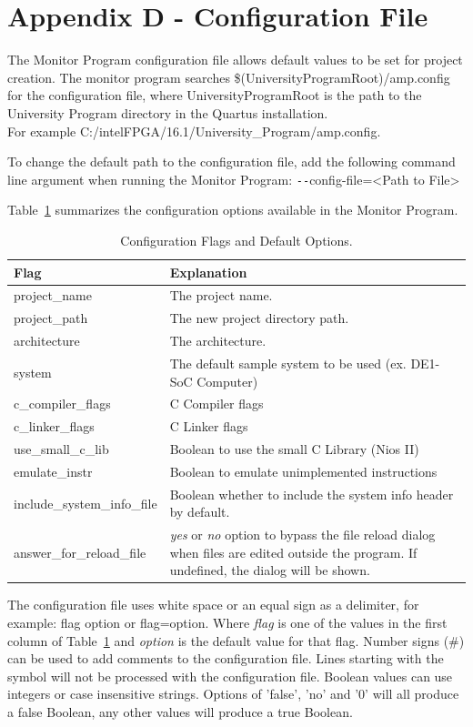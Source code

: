 \documentclass[11pt, twoside, pdftex]{article}
\newcommand{\commonPath}{../../Common}
\begin{document}
\section{Appendix D - Configuration File}
The Monitor Program configuration file allows default values to be set for project creation. The monitor program searches 
{\sf \$(UniversityProgramRoot)/amp.config} for the configuration file, where {\sf UniversityProgramRoot} is the path to the 
University Program directory in the Quartus installation.\\
For example {\sf C:/intelFPGA/16.1/University\_Program/amp.config}.

To change the default path to the configuration file, add the following command line argument 
when running the Monitor Program: {\sf \texttt{-}\texttt{-}config-file=<Path to File>}

Table~\ref{tbl:2} summarizes the configuration options available in the Monitor Program.

\begin{table}[h]
    \centering
    \begin{tabular}{|l|p{5in}|}
        \hline
        Flag & Explanation\\
        \hline\hline
				\hline
				project\_name				& The project name.\\
				project\_path				& The new project directory path.\\
				architecture				& The architecture.\\
				system							& The default sample system to be used (ex. DE1-SoC Computer)\\
				c\_compiler\_flags	& C Compiler flags\\
				c\_linker\_flags		& C Linker flags\\
				use\_small\_c\_lib	& Boolean to use the small C Library (Nios II)\\
				emulate\_instr			& Boolean to emulate unimplemented instructions\\
				include\_system\_info\_file & Boolean whether to include the system info header by default.\\
				answer\_for\_reload\_file & {\it yes} or {\it no} option to bypass the file reload dialog when files are edited outside the program. If undefined, the dialog will be shown.\\
				\hline
    \end{tabular}
    \caption{Configuration Flags and Default Options.} 
		\label{tbl:2}
\end{table}

The configuration file uses white space or an equal sign as a delimiter, for example: 
{\sf flag	option} or {\sf flag=option}. Where {\it flag} is one of the values in the first column of 
Table~\ref{tbl:2} and {\it option} is the default value for that flag. Number signs 
(\#) can be used to add comments to the configuration file. Lines starting with the symbol will
not be processed with the configuration file. Boolean values can use integers or case insensitive strings. 
Options of 'false', 'no' and '0' will all produce a false Boolean, any other values will produce a true Boolean.



\end{document}
